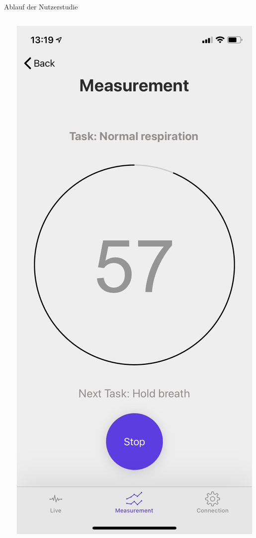 \documentclass[18pt]{beamer}
\begin{document}
\begin{frame}{Ablauf der Nutzerstudie}
\begin{center}
\begin{columns}[T]
\begin{column}{.33\textwidth}
            \end{column}%
            \hfill%
            \begin{column}{.33\textwidth}
                \centering
                \includegraphics[scale=0.1]{images/app/measurement_timer_02.png}
            \end{column}%
        \end{columns} 
    \end{center}
\end{frame}
\end{document}
